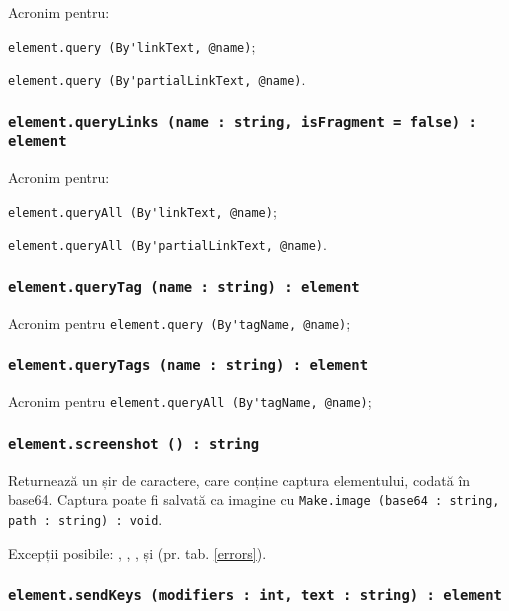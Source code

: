 Acronim pentru:
\begin{icItems}
	\item \lstinline|element.query (By'linkText, @name)|;
	\item \lstinline|element.query (By'partialLinkText, @name)|.
\end{icItems}

\subsubsection{\lstinline|element.queryLinks (name : string, isFragment = false) : element|}

Acronim pentru:
\begin{icItems}
	\item \lstinline|element.queryAll (By'linkText, @name)|;
	\item \lstinline|element.queryAll (By'partialLinkText, @name)|.
\end{icItems}

\subsubsection{\lstinline|element.queryTag (name : string) : element|}

Acronim pentru \lstinline|element.query (By'tagName, @name)|;

\subsubsection{\lstinline|element.queryTags (name : string) : element|}

Acronim pentru \lstinline|element.queryAll (By'tagName, @name)|;

\subsubsection{\lstinline|element.screenshot () : string|}

Returnează un șir de caractere, care conține captura elementului, codată în base64. Captura poate fi salvată ca imagine cu \lstinline|Make.image (base64 : string, path : string) : void|.

Excepții posibile: , , ,  și  (pr. tab. \ref{errors}).

\subsubsection{\lstinline|element.sendKeys (modifiers : int, text : string) : element|}


